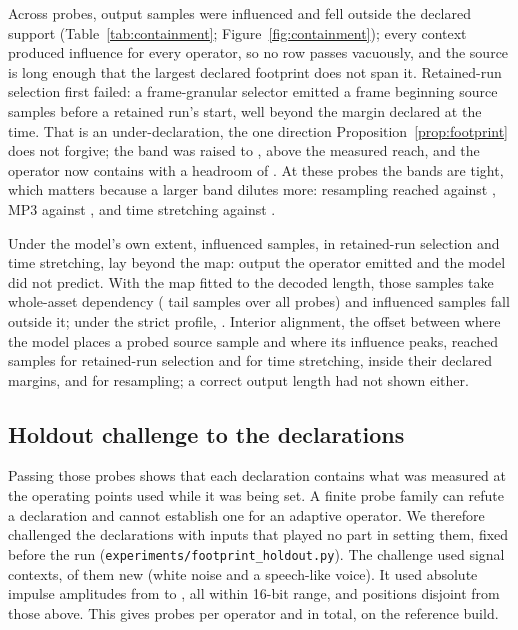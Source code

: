 \documentclass[preprint,3p,11pt,authoryear]{elsarticle}
\begin{document}
Across \Kprobes{} probes, \Kaffected{} output samples were influenced and
\Koutside{} fell outside the declared support (Table~\ref{tab:containment};
Figure~\ref{fig:containment});
every context produced influence for every operator, so no row passes
vacuously, and the source is long enough that the largest
declared footprint does not span it. Retained-run selection first failed: a
frame-granular selector emitted a frame
beginning \KsilenceReach{} source samples before a retained run's start, well
beyond the margin declared at the time. That is an under-declaration, the one
direction Proposition~\ref{prop:footprint} does not forgive; the band was
raised to \KsilenceFp{}, above the measured reach, and the operator now
contains with a headroom of \KsilenceMargin{}. At these probes the bands are tight, which matters because a larger band
dilutes more: resampling reached \KresampleReach{} against \KresampleFp{}, MP3
\KmpThreeReach{} against \KmpThreeFp{}, and time stretching \KstretchReach{}
against \KstretchFp{}.

Under the model's own extent, \KunmappedTotal{} influenced samples, in
retained-run selection and time stretching, lay beyond the map: output the
operator emitted and the model did not predict. With the map fitted to the
decoded length, those samples take whole-asset dependency (\KfallbackTotal{}
tail samples over all probes) and \KconfTotal{} influenced samples fall outside
it; under the strict profile, \KstrictProfileTotal{}. Interior alignment, the offset between where the model
places a probed source sample and where its influence peaks, reached
\KalignSelection{} samples for retained-run selection and \KalignStretch{} for
time stretching, inside their declared margins, and \KalignResample{} for
resampling; a correct output length had not shown either.

\subsection{Holdout challenge to the declarations}
\label{sec:res-holdout}

Passing those probes shows that each declaration contains what was measured at
the operating points used while it was being set. A finite probe family can
refute a declaration and cannot establish one for an adaptive operator. We
therefore challenged the declarations with inputs that played no part in setting them,
fixed before the run (\texttt{experiments/footprint\_holdout.py}). The challenge
used \KtwoContexts{} signal contexts, \KtwoHoldoutContexts{} of them new (white noise
and a speech-like voice). It used \KtwoAmps{} absolute impulse amplitudes from
\KtwoAmpMin{} to \KtwoAmpMax{}, all within 16-bit range, and \KtwoPositions{}
positions disjoint from those above. This gives \KtwoProbesPerOp{} probes per operator and
\KtwoProbes{} in total, on the reference build.
\end{document}
